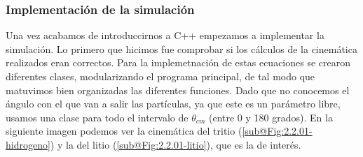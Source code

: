 \documentclass[12pt,a4paper]{article}
\numberwithin{equation}{section}
\numberwithin{figure}{section}
\begin{document}
\subsubsection{Implementación de la simulación} \label{Subsubsec:implementacion}
Una vez acabamos de introduccirnos a C++ empezamos a implementar la simulación. Lo primero que hicimos fue comprobar si los cálculos  de la cinemática realizados eran correctos. Para la implemetnación de estas ecuaciones se crearon diferentes clases, modularizando el programa principal, de tal modo que matuvimos bien organizadas las diferentes funciones. Dado que no conocemos el ángulo con el que van a salir las partículas, ya que este es un parámetro libre, usamos una clase para todo el intervalo de $\theta_{cm}$ (entre 0 y 180 grados). En la siguiente imagen podemos ver la cinemática del tritio (\ref{sub@Fig:2.2.01-hidrogeno}) y la del litio (\ref{sub@Fig:2.2.01-litio}), que es la de interés.   \\
\end{document}
